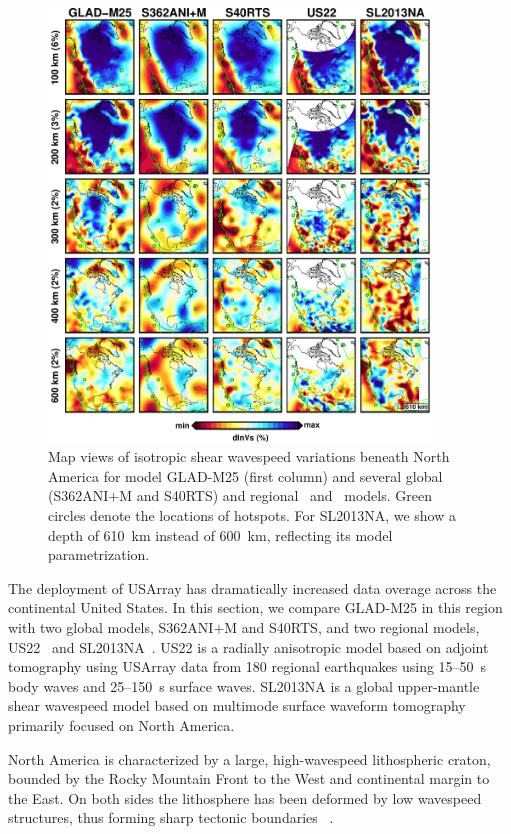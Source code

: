 \documentclass[extra,mreferee]{gji}
\begin{document}
\begin{figure}
\centering
\includegraphics[width=0.9\textwidth]{figures/depth_slice/america_vs.pdf}
  \caption{\small{Map views of isotropic shear wavespeed variations beneath North America 
  for model GLAD-M25 (first column) and several global (S362ANI$+$M and S40RTS)
  and regional~\citep[US22;][]{zhu2017radial} and~\citep[SL2013NA;][]{schaeffer2014imaging}
  models. Green circles denote the locations of hotspots. For SL2013NA, we
  show a depth of 610~km instead of 600~km, reflecting its model parametrization.}}
\label{fig:america-vs}
\end{figure}

The deployment of USArray has dramatically increased data overage across the
continental United States.
In this section, we compare GLAD-M25 in this region 
with two global models, S362ANI$+$M and S40RTS, and two regional models,
US22~\citep{zhu2017radial} and SL2013NA~\citep{schaeffer2014imaging}.
US22 is a radially anisotropic model based on adjoint tomography using
USArray data from 180 regional earthquakes using 15--50~s
body waves and 25--150~s surface waves.
SL2013NA is a global upper-mantle shear wavespeed model based on multimode
surface waveform tomography primarily focused on North America.

North America is characterized by a large, high-wavespeed lithospheric craton,
bounded by the Rocky Mountain Front to the West and continental
margin to the East. On both sides the lithosphere has been deformed by
low wavespeed structures, thus forming sharp tectonic boundaries
~\citep{grand1984upper,masters1996shear,grand1997high,
megnin2000three,gu2001models,schaeffer2014imaging,zhu2017radial}.
\end{document}
